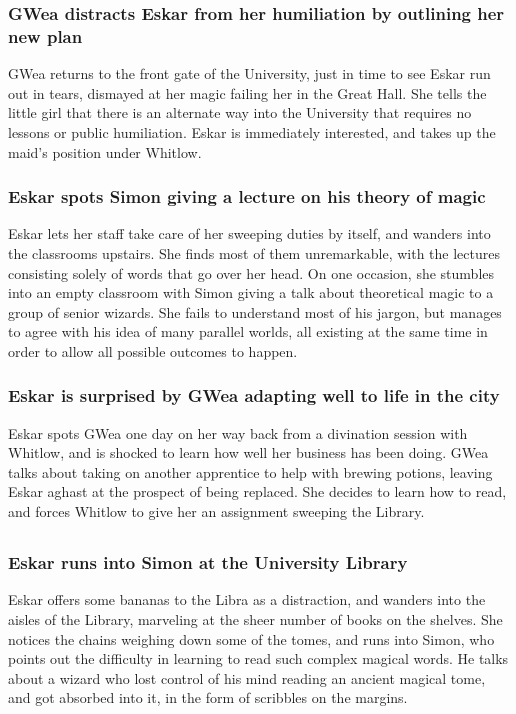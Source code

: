 \subsubsection{\Gls{GWea} distracts \Gls{Eskar} from her humiliation by outlining her new plan}
\Gls{GWea} returns to the front gate of the University, just in time to see \Gls{Eskar} run out in
tears, dismayed at her magic failing her in the Great Hall. She tells the little girl that there is
an alternate way into the University that requires no lessons or public humiliation. \Gls{Eskar} is
immediately interested, and takes up the maid's position under \Gls{Whitlow}.

\subsubsection{\Gls{Eskar} spots \Gls{Simon} giving a lecture on his theory of magic}
\Gls{Eskar} lets her staff take care of her sweeping duties by itself, and wanders into the
classrooms upstairs. She finds most of them unremarkable, with the lectures consisting solely of
words that go over her head. On one occasion, she stumbles into an empty classroom with \Gls{Simon}
giving a talk about theoretical magic to a group of senior wizards. She fails to understand most of
his jargon, but manages to agree with his idea of many parallel worlds, all existing at the same
time in order to allow all possible outcomes to happen.

\subsubsection{\Gls{Eskar} is surprised by \Gls{GWea} adapting well to life in the city}
\Gls{Eskar} spots \Gls{GWea} one day on her way back from a divination session with \Gls{Whitlow},
and is shocked to learn how well her business has been doing. \Gls{GWea} talks about taking on
another apprentice to help with brewing potions, leaving \Gls{Eskar} aghast at the prospect of being
replaced. She decides to learn how to read, and forces \Gls{Whitlow} to give her an assignment
sweeping the Library.

\subsection{}
\subsubsection{\Gls{Eskar} runs into \Gls{Simon} at the University Library}
\Gls{Eskar} offers some bananas to the \Gls{Libra} as a distraction, and wanders into the aisles of
the Library, marveling at the sheer number of books on the shelves. She notices the chains
weighing down some of the tomes, and runs into \Gls{Simon}, who points out the difficulty in
learning to read such complex magical words. He talks about a wizard who lost control of his mind
reading an ancient magical tome, and got absorbed into it, in the form of scribbles on the margins.

